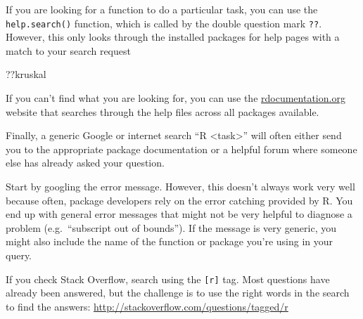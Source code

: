 \documentclass[
  letterpaper,
  DIV=11,
  numbers=noendperiod,
  oneside]{scrreprt}
\newenvironment{Shaded}{\begin{snugshade}}{\end{snugshade}}
\newcommand{\NormalTok}[1]{\textcolor[rgb]{0.00,0.23,0.31}{#1}}
\begin{document}
\begin{tcolorbox}[enhanced jigsaw, bottomrule=.15mm, colback=white, colframe=quarto-callout-note-color-frame, toprule=.15mm, coltitle=black, rightrule=.15mm, opacitybacktitle=0.6, colbacktitle=quarto-callout-note-color!10!white, toptitle=1mm, leftrule=.75mm, breakable, bottomtitle=1mm, titlerule=0mm, title=\textcolor{quarto-callout-note-color}{\faInfo}\hspace{0.5em}{I want to use a function that does X, there must be a function for it
but I dont know which one\ldots{}}, arc=.35mm, left=2mm, opacityback=0]

If you are looking for a function to do a particular task, you can use
the \texttt{help.search()} function, which is called by the double
question mark \texttt{??}. However, this only looks through the
installed packages for help pages with a match to your search request

\begin{Shaded}
\begin{Highlighting}[]
\NormalTok{??kruskal}
\end{Highlighting}
\end{Shaded}

If you can't find what you are looking for, you can use the
\href{http://www.rdocumentation.org}{rdocumentation.org} website that
searches through the help files across all packages available.

Finally, a generic Google or internet search ``R
\textless task\textgreater{}'' will often either send you to the
appropriate package documentation or a helpful forum where someone else
has already asked your question.

\end{tcolorbox}

\begin{tcolorbox}[enhanced jigsaw, bottomrule=.15mm, colback=white, colframe=quarto-callout-note-color-frame, toprule=.15mm, coltitle=black, rightrule=.15mm, opacitybacktitle=0.6, colbacktitle=quarto-callout-note-color!10!white, toptitle=1mm, leftrule=.75mm, breakable, bottomtitle=1mm, titlerule=0mm, title=\textcolor{quarto-callout-note-color}{\faInfo}\hspace{0.5em}{I get an error message that I dont understand}, arc=.35mm, left=2mm, opacityback=0]

Start by googling the error message. However, this doesn't always work
very well because often, package developers rely on the error catching
provided by R. You end up with general error messages that might not be
very helpful to diagnose a problem (e.g.~``subscript out of bounds'').
If the message is very generic, you might also include the name of the
function or package you're using in your query.

If you check Stack Overflow, search using the \texttt{{[}r{]}} tag. Most
questions have already been answered, but the challenge is to use the
right words in the search to find the answers:
\url{http://stackoverflow.com/questions/tagged/r}

\end{tcolorbox}
\end{document}
